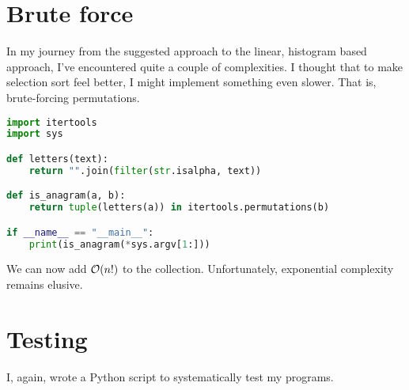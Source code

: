 \documentclass[fleqn,a4paper,11pt]{article}
\begin{document}
    \section{Brute force}

    In my journey from the suggested approach to the linear, histogram based
    approach, I've encountered quite a couple of complexities. I thought that to
    make selection sort feel better, I might implement something even slower.
    That is, brute-forcing permutations.

\begin{lstlisting}[language=Python, caption=Brute force]
import itertools
import sys

def letters(text):
    return "".join(filter(str.isalpha, text))

def is_anagram(a, b):
    return tuple(letters(a)) in itertools.permutations(b)

if __name__ == "__main__":
    print(is_anagram(*sys.argv[1:]))
\end{lstlisting}

    We can now add \(\operatorname{\mathcal O}(n!)\) to the collection. Unfortunately, exponential
    complexity remains elusive.

    \section{Testing}

    I, again, wrote a Python script to systematically test my programs.
\end{document}
